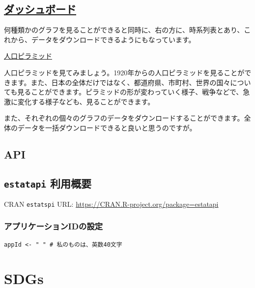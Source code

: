 \documentclass[
  xelatex, ja=standard]{bxjsbook}
\theoremstyle{definition}
\theoremstyle{definition}
\theoremstyle{definition}
\theoremstyle{definition}
\theoremstyle{remark}
\begin{document}
\hypertarget{ux30c0ux30c3ux30b7ux30e5ux30dcux30fcux30c9-4}{%
\section{\texorpdfstring{\href{https://dashboard.e-stat.go.jp}{ダッシュボード}}{ダッシュボード}}\label{ux30c0ux30c3ux30b7ux30e5ux30dcux30fcux30c9-4}}

何種類かのグラフを見ることができると同時に、右の方に、時系列表とあり、これから、データをダウンロードできるようにもなっています。

\href{https://dashboard.e-stat.go.jp/pyramidGraph?screenCode=00570\&regionCode=00000\&pyramidAreaType=2}{人口ピラミッド}

人口ピラミッドを見てみましょう。1920年からの人口ピラミッドを見ることができます。また、日本の全体だけではなく、都道府県、市町村、世界の国々についても見ることができます。ピラミッドの形が変わっていく様子、戦争などで、急激に変化する様子なども、見ることができます。

また、それぞれの個々のグラフのデータをダウンロードすることができます。全体のデータを一括ダウンロードできると良いと思うのですが。

\hypertarget{api-4}{%
\section{API}\label{api-4}}

\hypertarget{estatapi-ux5229ux7528ux6982ux8981}{%
\section{\texorpdfstring{\texttt{estatapi} 利用概要}{estatapi 利用概要}}\label{estatapi-ux5229ux7528ux6982ux8981}}

CRAN \texttt{estatspi} URL: \url{https://CRAN.R-project.org/package=estatapi}

\hypertarget{ux30a2ux30d7ux30eaux30b1ux30fcux30b7ux30e7ux30f3idux306eux8a2dux5b9a}{%
\subsection{アプリケーションIDの設定}\label{ux30a2ux30d7ux30eaux30b1ux30fcux30b7ux30e7ux30f3idux306eux8a2dux5b9a}}

\begin{verbatim}
appId <- " " # 私のものは、英数40文字
\end{verbatim}

\hypertarget{sdgs-site}{%
\chapter{SDGs}\label{sdgs-site}}
\end{document}
